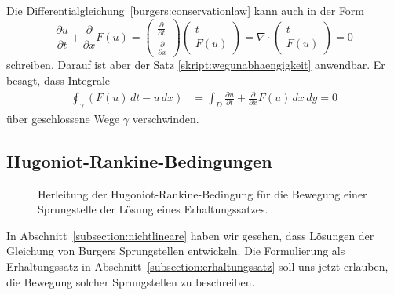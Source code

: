 Die Differentialgleichung~\eqref{burgers:conservationlaw} kann auch
in der Form
\[
\frac{\partial u}{\partial t}
+
\frac{\partial }{\partial x} F(u)
=
\begin{pmatrix}
\frac{\partial}{\partial t}
\\
\frac{\partial}{\partial x}
\end{pmatrix}
\begin{pmatrix}t\\F(u)\end{pmatrix}
=
\nabla\cdot 
\begin{pmatrix}t\\F(u)\end{pmatrix}
=0
\]
schreiben.
Darauf ist aber der Satz \ref{skript:wegunabhaengigkeit} anwendbar.
Er besagt, dass Integrale
\begin{align}
\oint_\gamma(
F(u)\,dt
-
u\,dx
)
&=
\int_D \frac{\partial u}{\partial t}+\frac{\partial}{\partial x}F(u)\,dx\,dy
=
0
\label{burgers:integral}
\end{align}
über geschlossene Wege $\gamma$ verschwinden.

\subsection{Hugoniot-Rankine-Bedingungen\label{subsection:hugnoniot}}
\begin{figure}
\centering
{}
\caption{Herleitung der Hugoniot-Rankine-Bedingung für die Bewegung einer
Sprungstelle der Lösung eines Erhaltungssatzes.
\label{burgers:hugoniot}}
\end{figure}
In Abschnitt~\ref{subsection:nichtlineare} haben wir gesehen, dass Lösungen
der Gleichung von Burgers Sprungstellen entwickeln.
Die Formulierung als Erhaltungssatz in
Abschnitt~\ref{subsection:erhaltungssatz} 
soll uns jetzt erlauben, die Bewegung solcher Sprungstellen zu beschreiben.

